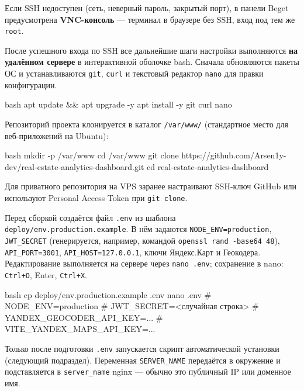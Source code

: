 Если SSH недоступен (сеть, неверный пароль, закрытый порт), в панели Beget предусмотрена \textbf{VNC-консоль} --- терминал в браузере без SSH, вход под тем же \texttt{root}.

После успешного входа по SSH все дальнейшие шаги настройки выполняются \textbf{на удалённом сервере} в интерактивной оболочке bash. Сначала обновляются пакеты ОС и устанавливаются \texttt{git}, \texttt{curl} и текстовый редактор \texttt{nano} для правки конфигурации.

\begin{singleminted}{bash}
apt update && apt upgrade -y
apt install -y git curl nano
\end{singleminted}
\label{lst:ssh-apt}

Репозиторий проекта клонируется в каталог \texttt{/var/www/} (стандартное место для веб-приложений на Ubuntu):

\begin{singleminted}{bash}
mkdir -p /var/www
cd /var/www
git clone https://github.com/Arsen1y-dev/real-estate-analytics-dashboard.git
cd real-estate-analytics-dashboard
\end{singleminted}
\label{lst:ssh-clone}

Для приватного репозитория на VPS заранее настраивают SSH-ключ GitHub или используют Personal Access Token при \texttt{git clone}.

Перед сборкой создаётся файл \texttt{.env} из шаблона \texttt{deploy/env.production.example}. В нём задаются \texttt{NODE\_ENV=production}, \texttt{JWT\_SECRET} (генерируется, например, командой \texttt{openssl rand -base64 48}), \texttt{API\_PORT=3001}, \texttt{API\_HOST=127.0.0.1}, ключи Яндекс.Карт и Геокодера. Редактирование выполняется на сервере через \texttt{nano .env}; сохранение в nano: \texttt{Ctrl+O}, Enter, \texttt{Ctrl+X}.

\begin{singleminted}{bash}
cp deploy/env.production.example .env
nano .env
# NODE_ENV=production
# JWT_SECRET=<случайная строка>
# YANDEX_GEOCODER_API_KEY=...
# VITE_YANDEX_MAPS_API_KEY=...
\end{singleminted}
\label{lst:ssh-env}

Только после подготовки \texttt{.env} запускается скрипт автоматической установки (следующий подраздел). Переменная \texttt{SERVER\_NAME} передаётся в окружение и подставляется в \texttt{server\_name} nginx --- обычно это публичный IP или доменное имя.

